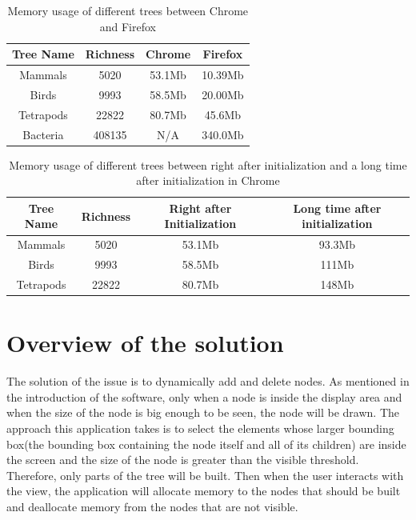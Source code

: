 \documentclass[MSc]{icldt}
\begin{document}
 \begin{table} [H]
	\centering %
	\begin{tabular}{|c c c c|} %
		\hline %
		Tree Name & Richness  & Chrome & Firefox\\ %
		\hline  %
		Mammals & 5020 &  53.1Mb & 10.39Mb\\  %
		\hline
		Birds & 9993 &  58.5Mb & 20.00Mb\\
		\hline
		Tetrapods & 22822 & 80.7Mb & 45.6Mb\\ 
		\hline %
		Bacteria & 408135 & N/A & 340.0Mb \\ [1ex] %
		\hline
	\end{tabular}
	\label{table:nonlin} %
	\caption{Memory usage of different trees between Chrome and Firefox} %
\end{table}

\begin{table} [H]
	\centering %
	\begin{tabular}{|c c c c|} %
		\hline %
		Tree Name & Richness  & Right after Initialization & Long time after initialization\\ %
		\hline  %
		Mammals & 5020 &  53.1Mb & 93.3Mb\\  %
		\hline
		Birds & 9993 &  58.5Mb & 111Mb\\
		\hline
		Tetrapods & 22822 & 80.7Mb & 148Mb\\  [1ex] %
		\hline
	\end{tabular}
	\label{table:nonlin} %
	\caption{Memory usage of different trees between right after initialization and a long time after 
	initialization in Chrome } %
\end{table}


\section{Overview of the solution}

The solution of the issue is to dynamically add and delete nodes. As mentioned in the introduction of the software, only when a node is inside the display area and when the size of the node is big enough to be seen, the node will be drawn. The approach this application takes is to select the elements whose larger bounding box(the bounding box containing the node itself and all of its children) are inside the screen and the size of the node is greater than the visible threshold. Therefore, only parts of the tree will be built. Then when the user interacts with the view, the application will allocate memory to the nodes that should be built and deallocate memory from the nodes that are not visible.
\end{document}
